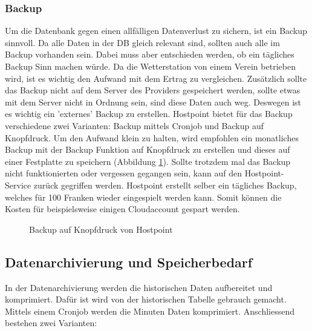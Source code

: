 \subsubsection{Backup}
Um die Datenbank gegen einen allfälligen Datenverlust zu sichern, ist ein Backup sinnvoll. Da alle Daten in der DB gleich relevant sind, sollten auch alle im Backup vorhanden sein. Dabei muss aber entschieden werden, ob ein tägliches Backup Sinn machen würde. Da die Wetterstation von einem Verein betrieben wird, ist es wichtig den Aufwand mit dem Ertrag zu vergleichen. Zusätzlich sollte das Backup nicht auf dem Server des Providers gespeichert werden, sollte etwas mit dem Server nicht in Ordnung sein, sind diese Daten auch weg. Deswegen ist es wichtig ein 'externes' Backup zu erstellen. Hostpoint bietet für das Backup verschiedene zwei Varianten: Backup mittels Cronjob und Backup auf Knopfdruck. Um den Aufwand klein zu halten, wird empfohlen ein monatliches Backup mit der Backup Funktion auf Knopfdruck zu erstellen und dieses auf einer Festplatte zu speichern (Abbildung \ref{img:backup}). Sollte trotzdem mal das Backup nicht funktionierten oder vergessen gegangen sein, kann auf den Hostpoint-Service zurück gegriffen werden. Hostpoint erstellt selber ein tägliches Backup, welches für 100 Franken wieder eingespielt werden kann. Somit können die Kosten für beispielsweise einigen Cloudaccount gespart werden.

\begin{figure}[htbp!]
	\centering
	\caption{Backup auf Knopfdruck von Hostpoint}
	\label{img:backup}
\end{figure}


\subsection{Datenarchivierung und Speicherbedarf}
In der Datenarchivierung werden die historischen Daten aufbereitet und komprimiert. Dafür ist wird von der historischen Tabelle gebrauch gemacht. Mittels einem Cronjob werden die Minuten Daten komprimiert. Anschliessend bestehen zwei Varianten:

